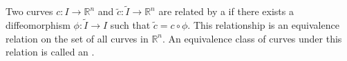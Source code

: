 Two curves $c: I \rightarrow \mathbb{R}^n$ and $\tilde{c}: \tilde{I} \rightarrow \mathbb{R}^n$ are related by a  if there exists a diffeomorphism $\phi: \tilde{I} \rightarrow I$ such that $\tilde{c} = c \circ \phi$. This relationship is an equivalence relation on the set of all curves in $\mathbb{R}^n$. An equivalence class of curves under this relation is called an .
